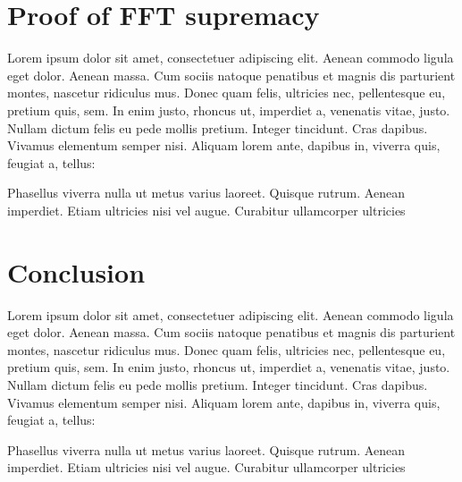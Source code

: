 \documentclass[paper=a4, fontsize=11pt]{scrartcl}
\numberwithin{equation}{section}		%
\numberwithin{figure}{section}			%
\numberwithin{table}{section}				%
\begin{document}
\section{Proof of FFT supremacy}
Lorem ipsum dolor sit amet, consectetuer adipiscing elit. Aenean commodo ligula eget dolor. Aenean massa. Cum sociis natoque penatibus et magnis dis parturient montes, nascetur ridiculus mus. Donec quam felis, ultricies nec, pellentesque eu, pretium quis, sem. In enim justo, rhoncus ut, imperdiet a, venenatis vitae, justo. Nullam dictum felis eu pede mollis pretium. Integer tincidunt. Cras dapibus. Vivamus elementum semper nisi. Aliquam lorem ante, dapibus in, viverra quis, feugiat a, tellus:

Phasellus viverra nulla ut metus varius laoreet. Quisque rutrum. Aenean imperdiet. Etiam ultricies nisi vel augue. Curabitur ullamcorper ultricies 

\section{Conclusion}
Lorem ipsum dolor sit amet, consectetuer adipiscing elit. Aenean commodo ligula eget dolor. Aenean massa. Cum sociis natoque penatibus et magnis dis parturient montes, nascetur ridiculus mus. Donec quam felis, ultricies nec, pellentesque eu, pretium quis, sem. In enim justo, rhoncus ut, imperdiet a, venenatis vitae, justo. Nullam dictum felis eu pede mollis pretium. Integer tincidunt. Cras dapibus. Vivamus elementum semper nisi. Aliquam lorem ante, dapibus in, viverra quis, feugiat a, tellus:

Phasellus viverra nulla ut metus varius laoreet. Quisque rutrum. Aenean imperdiet. Etiam ultricies nisi vel augue. Curabitur ullamcorper ultricies 

% 
% 
\end{document}
